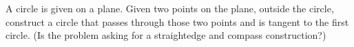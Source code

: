 A circle is given on a plane.
Given two points on the plane, outside the circle,
construct a circle that passes through those two points
and is tangent to the first circle.
\newline (Is the problem asking for a straightedge and compass construction?)
